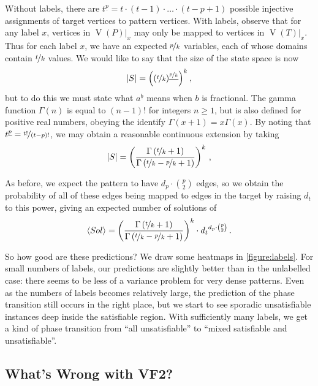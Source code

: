 \documentclass[twoside,11pt]{article}
\begin{document}
Without labels, there are $t^{\underline{p}} = t \cdot (t - 1) \cdot \ldots \cdot (t - p + 1)$
possible injective assignments of target vertices to pattern vertices.  With labels, observe that
for any label $x$, vertices in $\operatorname{V}(P)|_x$ may only be mapped to vertices in
$\operatorname{V}(T)|_x$.  Thus for each label $x$, we have an expected $\nicefrac{p}{k}$ variables,
each of whose domains contain $\nicefrac{t}{k}$ values. We would like to say that the size of the
state space is now \[ |S| = \left((\nicefrac{t}{k})^{\underline{\nicefrac{p}{k}}}\right)^{k}
\textnormal{,} \] but to do this we must state what $a^{\underline{b}}$ means when $b$ is
fractional. The gamma function $\Gamma(n)$ is equal to $(n - 1)!$ for integers $n \ge 1$, but is also
defined for positive real numbers, obeying the identify $\Gamma(x + 1) = x\Gamma(x)$. By noting that
$t^{\underline{p}} = \nicefrac{t!}{(t - p)!}$, we may obtain a reasonable
continuous extension by taking \[ |S| = \left(\frac{\Gamma\left(\nicefrac{t}{k} +
1\right)}{\Gamma\left(\nicefrac{t}{k} - \nicefrac{p}{k} + 1\right)}\right)^{k} \textnormal{\,,} \]

As before, we expect the pattern to have $d_p \cdot \binom{p}{2}$ edges, so we obtain the
probability of all of these edges being mapped to edges in the target by raising $d_t$ to this
power, giving an expected number of solutions of \begin{equation} \langle Sol \rangle = \left(
    \frac{\Gamma\left(\nicefrac{t}{k} + 1\right)}{\Gamma\left(\nicefrac{t}{k} - \nicefrac{p}{k} +
1\right)} \right)^{k}  \cdot
{d_t}^{d_p \cdot \binom{p}{2}} \textnormal{\,.} \end{equation}

So how good are these predictions? We draw some heatmaps in \cref{figure:labels}. For small numbers
of labels, our predictions are slightly better than in the unlabelled case: there seems to be less
of a variance problem for very dense patterns. Even as the numbers of labels becomes relatively
large, the prediction of the phase transition still occurs in the right place, but we start to see
sporadic unsatisfiable instances deep inside the satisfiable region. With sufficiently many labels,
we get a kind of phase transition from ``all unsatisfiable'' to ``mixed satisfiable and
unsatisfiable''.

\subsection{What's Wrong with VF2?}
\end{document}

